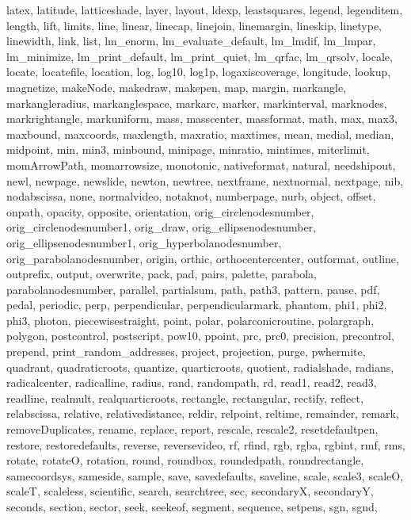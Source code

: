 {{  latex, latitude, latticeshade, layer, layout, ldexp, leastsquares, legend,
  legenditem, length, lift, limits, line, linear, linecap, linejoin,
  linemargin, lineskip, linetype, linewidth, link, list, lm_enorm,
  lm_evaluate_default, lm_lmdif, lm_lmpar, lm_minimize, lm_print_default,
  lm_print_quiet, lm_qrfac, lm_qrsolv, locale, locate, locatefile, location,
  log, log10, log1p, logaxiscoverage, longitude, lookup, magnetize, makeNode,
  makedraw, makepen, map, margin, markangle, markangleradius, markanglespace,
  markarc, marker, markinterval, marknodes, markrightangle, markuniform,
  mass, masscenter, massformat, math, max, max3, maxbound, maxcoords,
  maxlength, maxratio, maxtimes, mean, medial, median, midpoint, min, min3,
  minbound, minipage, minratio, mintimes, miterlimit, momArrowPath,
  momarrowsize, monotonic, nativeformat, natural, needshipout, newl, newpage,
  newslide, newton, newtree, nextframe, nextnormal, nextpage, nib,
  nodabscissa, none, normalvideo, notaknot, numberpage, nurb, object, offset,
  onpath, opacity, opposite, orientation, orig_circlenodesnumber,
  orig_circlenodesnumber1, orig_draw, orig_ellipsenodesnumber,
  orig_ellipsenodesnumber1, orig_hyperbolanodesnumber,
  orig_parabolanodesnumber, origin, orthic, orthocentercenter, outformat,
  outline, outprefix, output, overwrite, pack, pad, pairs, palette, parabola,
  parabolanodesnumber, parallel, partialsum, path, path3, pattern, pause,
  pdf, pedal, periodic, perp, perpendicular, perpendicularmark, phantom,
  phi1, phi2, phi3, photon, piecewisestraight, point, polar,
  polarconicroutine, polargraph, polygon, postcontrol, postscript, pow10,
  ppoint, prc, prc0, precision, precontrol, prepend, print_random_addresses,
  project, projection, purge, pwhermite, quadrant, quadraticroots, quantize,
  quarticroots, quotient, radialshade, radians, radicalcenter, radicalline,
  radius, rand, randompath, rd, read1, read2, read3, readline, realmult,
  realquarticroots, rectangle, rectangular, rectify, reflect, relabscissa,
  relative, relativedistance, reldir, relpoint, reltime, remainder, remark,
  removeDuplicates, rename, replace, report, rescale, rescale2,
  resetdefaultpen, restore, restoredefaults, reverse, reversevideo, rf,
  rfind, rgb, rgba, rgbint, rmf, rms, rotate, rotateO, rotation, round,
  roundbox, roundedpath, roundrectangle, samecoordsys, sameside, sample,
  save, savedefaults, saveline, scale, scale3, scaleO, scaleT, scaleless,
  scientific, search, searchtree, sec, secondaryX, secondaryY, seconds,
  section, sector, seek, seekeof, segment, sequence, setpens, sgn, sgnd,
}}
